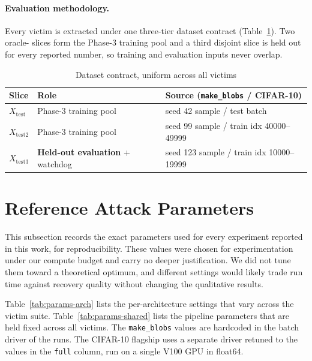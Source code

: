 \documentclass[runningheads,orivec]{llncs}
\begin{document}
\paragraph{Evaluation methodology.}
Every victim is extracted under one three-tier dataset contract
(Table~\ref{tab:datacontract}). Two oracle- slices form the Phase-3 training pool and a third disjoint slice is held out for every reported number, so training and evaluation inputs never overlap.

\begin{table}[H]
\centering
\caption{Dataset contract, uniform across all victims}
\label{tab:datacontract}
\begin{tabular}{lll}
\toprule
Slice & Role & Source (\texttt{make\_blobs} / CIFAR-10) \\
\midrule
$X_{\mathrm{test}}$  & Phase-3 training pool                   & seed 42 sample / test batch \\
$X_{\mathrm{test2}}$ & Phase-3 training pool                   & seed 99 sample / train idx 40000--49999 \\
$X_{\mathrm{test3}}$ & \textbf{Held-out evaluation} + watchdog & seed 123 sample / train idx 10000--19999 \\
\bottomrule
\end{tabular}
\end{table}

\section{Reference Attack Parameters}
\label{app:exp:params}
This subsection records the exact parameters used for every experiment reported in
this work, for reproducibility. These values were chosen for experimentation under
our compute budget and carry no deeper justification. We did not tune them toward a
theoretical optimum, and different settings would likely trade run time against
recovery quality without changing the qualitative results.

Table~\ref{tab:params-arch} lists the per-architecture settings that vary across the
victim suite. Table~\ref{tab:params-shared} lists the pipeline parameters that are held
fixed across all victims. The \texttt{make\_blobs} values are hardcoded in the batch
driver of the runs. The CIFAR-10 flagship uses a separate driver retuned to the values in
the \texttt{full} column, run on a single V100 GPU in float64.
\end{document}
